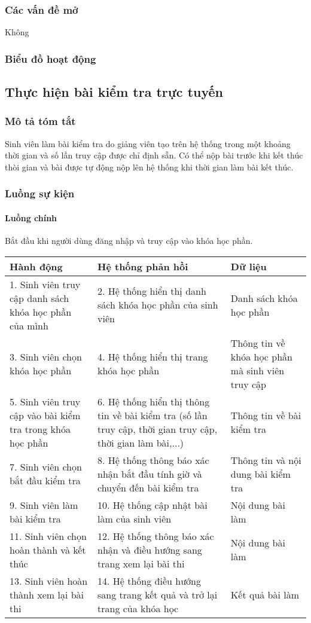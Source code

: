 \documentclass[./../main_file.tex]{subfiles}
\begin{document}
\subsubsection{Các vấn đề mở}
Không

\subsubsection{Biểu đồ hoạt động}

\subsection{Thực hiện bài kiểm tra trực tuyến}
\subsubsection{Mô tả tóm tắt}
Sinh viên làm bài kiểm tra do giảng viên tạo trên hệ thống trong một khoảng thời gian và số lần truy cập được chỉ định sẵn. Có thể nộp bài trước khi kết thúc thòi gian và bài được tự động nộp lên hệ thống khi thời gian làm bài kết thúc.

\subsubsection{Luồng sự kiện}
\paragraph{Luồng chính}
Bắt đầu khi người dùng đăng nhập và truy cập vào khóa học phần.
\begin{longtable}{|p{}|p{}|p{}|}
		\hline
		\textbf{Hành động} &
		\textbf{Hệ thống phản hồi} &
		\textbf{Dữ liệu} \\ \hline
		1. Sinh viên truy cập danh sách khóa học phần của mình &
		2. Hệ thống hiển thị danh sách khóa học phần của sinh viên &
		Danh sách khóa học phần \\ \hline
		3. Sinh viên chọn khóa học phần &
		4.  Hệ thống hiển thị trang khóa học phần &
		Thông tin về khóa học phần mà sinh viên truy cập \\ \hline
		5. Sinh viên truy cập vào bài kiểm tra trong khóa học phần &
		6. Hệ thống hiển thị thông tin về bài kiểm tra (số lần truy cập, thời gian truy cập, thời gian làm bài,...) &
		Thông tin về bài kiểm tra \\ \hline
		7. Sinh viên chọn bắt đầu kiểm tra &
		8. Hệ thống thông báo xác nhận bắt đầu tính giờ và chuyển đến bài kiểm tra &
		Thông tin và nội dung bài kiểm tra \\ \hline
		9. Sinh viên làm bài kiểm tra &
		10. Hệ thống cập nhật bài làm của sinh viên &
		Nội dung bài làm \\ \hline
		11. Sinh viên chọn hoàn thành và kết thúc &
		12. Hệ thống thông báo xác nhận và điều hướng sang trang xem lại bài thi &
		Nội dung bài làm \\ \hline
		13. Sinh viên hoàn thành xem lại bài thi &
		14. Hệ thống điều hướng sang trang kết quả và trở lại trang của khóa học &
		Kết quả bài làm \\ \hline
\end{longtable}
\end{document}
